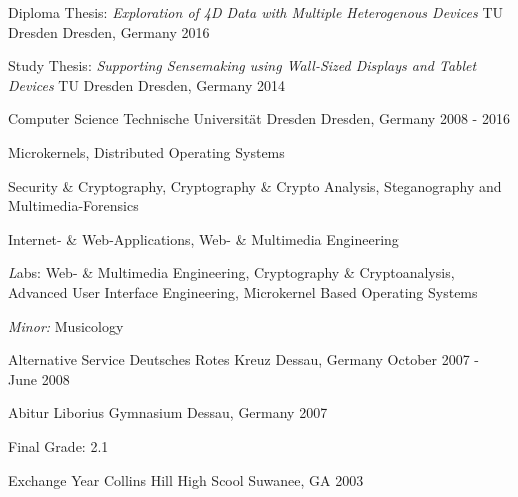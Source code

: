 \begin{cventries}

  \cventry
    {Diploma Thesis: \quad
      \textit{Exploration of 4D Data with Multiple Heterogenous Devices}}
    {TU Dresden}
    {Dresden, Germany}
    {2016}
    {
      \begin{cvitems}
      \item[]{}
      \end{cvitems}
    }

  \cventry
    {Study Thesis:\quad
      \textit{Supporting Sensemaking using Wall-Sized Displays and Tablet Devices}}
    {TU Dresden}
    {Dresden, Germany}
    {2014}
    {
      \begin{cvitems}
      \item[] {}
      \end{cvitems}
    }

  \cventry
    {Computer Science}
    {Technische Universität Dresden}
    {Dresden, Germany}
    {2008 - 2016}
    {
      \begin{cvitems}
      \item {
          Microkernels, Distributed Operating Systems
        }
      \item {
          Security \& Cryptography,
          Cryptography \& Crypto Analysis,
          Steganography and Multimedia-Forensics
        }
      \item {
          Internet- \& Web-Applications, Web- \& Multimedia Engineering
        }
      \item {
          {\textit Labs:}  Web- \& Multimedia Engineering,
          Cryptography \& Cryptoanalysis,
          Advanced User Interface Engineering,
          Microkernel Based Operating Systems
        }
      \item {\textit{Minor:} Musicology}
      \end{cvitems}
    }

  \cventry
    {Alternative Service}
    {Deutsches Rotes Kreuz}
    {Dessau, Germany}
    {October 2007 - June 2008}
    {
    }

  \cventry
    {Abitur}
    {Liborius Gymnasium}
    {Dessau, Germany}
    {2007}
    {
      \begin{cvitems}
      \item[] {Final Grade: 2.1}
      \end{cvitems}
    }
  \cventry
    {Exchange Year}
    {Collins Hill High Scool}
    {Suwanee, GA}
    {2003}
    {
      \begin{cvitems}
      \end{cvitems}
    }
\end{cventries}
